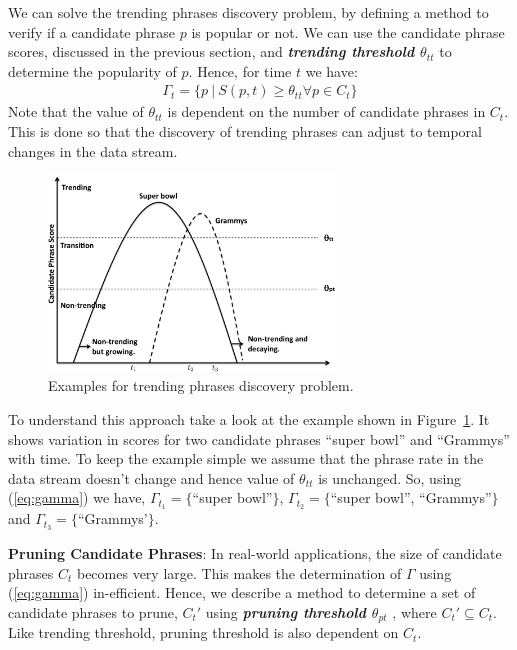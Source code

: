\documentclass{sig-alternate}
\begin{document}
We can solve the trending phrases discovery problem, by defining a method to verify if a candidate phrase $p$ is popular or not. We can use the candidate phrase scores, discussed in the previous section, and \textit{\textbf{trending threshold $\theta_{tt}$} } to determine the popularity of $p$. Hence, for time $t$ we have:
\begin{align}
 \Gamma_t = \{p\ |\ S(p, t) \geq \theta_{tt}  \forall p \in C_t\} 
\label{eq:gamma}
\end{align}
\noindent Note that the value of $\theta_{tt}$  is dependent on the number of candidate phrases in $C_t$. This is done so that the discovery of trending phrases can adjust to temporal changes in the data stream.

\begin{figure}[!t]
\begin{center}
\includegraphics[width=3.0in]{images/candidate_phrases}
\caption{Examples for trending phrases discovery problem.}
\label{fig:candidate_phrases}
\end{center}
\end{figure}

To understand this approach take a look at the example shown in Figure~\ref{fig:candidate_phrases}. It shows variation in scores for two candidate phrases ``super bowl'' and ``Grammys'' with time. To keep the example simple we assume that the phrase rate in the data stream doesn't change and hence value of $\theta_{tt}$ is unchanged. So, using (\ref{eq:gamma}) we have, $\Gamma_{t_1} = \{$``super bowl''$\}$, $\Gamma_{t_2} = \{$``super bowl'', ``Grammys''$\}$ and $\Gamma_{t_3} = \{$``Grammys'$\}$.

\medskip\noindent\textbf{Pruning Candidate Phrases}: In real-world applications, the size of candidate phrases $C_t$ becomes very large. This makes the determination of $\Gamma$ using (\ref{eq:gamma}) in-efficient. Hence, we describe a method to determine a set of candidate phrases to prune, $C_{t}'$ using \textit{\textbf{pruning threshold $\theta_{pt}$} }, where $C_{t}' \subseteq C_t$.  Like trending threshold, pruning threshold is also dependent on $C_t$.
\end{document}
